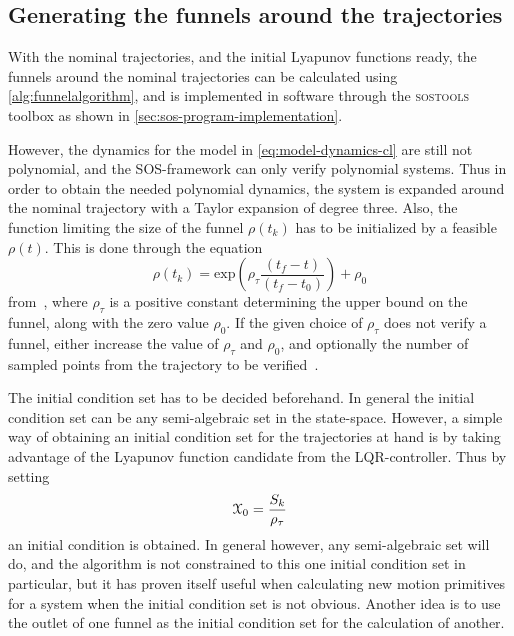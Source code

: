 \subsection{Generating the funnels around the trajectories}
\label{subsec:generating-funnels}

With the nominal trajectories, and the initial Lyapunov functions ready, the
funnels around the nominal trajectories can be calculated using
\cref{alg:funnelalgorithm}, and is implemented in software through the
\textsc{sostools}~\cite{sostools} toolbox as shown in
\vref{sec:sos-program-implementation}.

However, the dynamics for the model in \cref{eq:model-dynamics-cl} are still not
polynomial, and the \ac{SOS}-framework can only verify polynomial systems. Thus
in order to obtain the needed polynomial dynamics, the system is expanded around
the nominal trajectory with a Taylor expansion of degree three. Also, the
function limiting the size of the funnel \(\rho(t_{k})\) has to be initialized
by a feasible \(\rho(t)\). This is done through the equation
\begin{equation}
  \rho(t_{k}) = \mathrm{exp}\left( \rho_{\tau}\frac{\left( t_{f} - t \right)}{\left( t_{f} - t_{0}  \right)}\right) + \rho_0
\end{equation}
from~\cite[eq.~6][.sec~3]{Tobenkin_2011}, where \(\rho_{\tau}\) is a positive
constant determining the upper bound on the funnel, along with the zero value
\(\rho_0\). If the given choice of \(\rho_{\tau}\) does not verify a funnel,
either increase the value of \(\rho_{\tau}\) and \(\rho_0\), and optionally the
number of sampled points from the trajectory to be
verified~\cite{Tobenkin_2011}.

The initial condition set has to be decided beforehand. In general the initial
condition set can be any semi-algebraic set in the state-space. However, a
simple way of obtaining an initial condition set for the trajectories at hand is
by taking advantage of the Lyapunov function candidate from the
\ac{LQR}-controller. Thus by setting
\begin{equation}
  \mathcal{X}_{0} = \frac{ S_{k}}{\rho_{\tau}}
\end{equation}
an initial condition is obtained. In general however, any semi-algebraic set
will do, and the algorithm is not constrained to this one initial condition set
in particular, but it has proven itself useful when calculating new motion
primitives for a system when the initial condition set is not obvious. Another
idea is to use the outlet of one funnel as the initial condition set for the
calculation of another.

